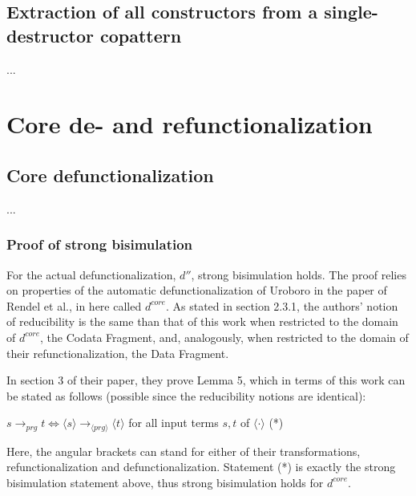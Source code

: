 \subsection{Extraction of all constructors from a single-destructor copattern}

...


\section{Core de- and refunctionalization}

\subsection{Core defunctionalization}

...

\subsubsection{Proof of strong bisimulation}

For the actual defunctionalization, $d''$, strong bisimulation holds. The proof relies on properties of the automatic defunctionalization of Uroboro in the paper of Rendel et al., in here called $d^{core}$. As stated in section 2.3.1, the authors' notion of reducibility is the same than that of this work when restricted to the domain of $d^{core}$, the Codata Fragment, and, analogously, when restricted to the domain of their refunctionalization, the Data Fragment.

In section 3 of their paper, they prove Lemma 5, which in terms of this work can be stated as follows (possible since the reducibility notions are identical):

$s \longrightarrow_{prg} t \iff \langle s \rangle \longrightarrow_{\langle prg \rangle} \langle t \rangle$ for all input terms $s,t$ of $\langle \cdot \rangle$ (*)

Here, the angular brackets can stand for either of their transformations, refunctionalization and defunctionalization. Statement (*) is exactly the strong bisimulation statement above, thus strong bisimulation holds for $d^{core}$.

